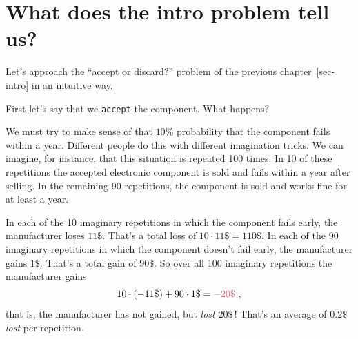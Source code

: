 \documentclass[
  a4paper,
  DIV=11,
  numbers=noendperiod,
  oneside]{scrreprt}
\begin{document}
\providecommand{\ul}{\uline}
\renewcommand*{\|}[1][]{\nonscript\:#1\vert\nonscript\:\mathopen{}}
\providecommand*{\pr}[1]{\textsf{\small`#1'}}
\renewcommand*{\pr}[1]{\textsf{\small`#1'}}
\providecommand*{\prq}[1]{\textsf{\small #1}}
\renewcommand*{\prq}[1]{\textsf{\small #1}}
\providecommand{\se}[1]{\mathsfit{#1}}
\renewcommand{\se}[1]{\mathsfit{#1}}
\providecommand{\p}{\mathrm{p}}
\renewcommand{\p}{\mathrm{p}}
\renewcommand{\P}{\mathrm{P}}

\hypertarget{what-does-the-intro-problem-tell-us}{%
\section{What does the intro problem tell
us?}\label{what-does-the-intro-problem-tell-us}}

Let's approach the ``accept or discard?'' problem of the previous
chapter~\ref{sec-intro} in an intuitive way.


First let's say that we \texttt{accept} the component. What happens?

We must try to make sense of that \(10\%\) probability that the
component fails within a year. Different people do this with different
imagination tricks. We can imagine, for instance, that this situation is
repeated 100 times. In 10 of these repetitions the accepted electronic
component is sold and fails within a year after selling. In the
remaining 90 repetitions, the component is sold and works fine for at
least a year.

In each of the 10 imaginary repetitions in which the component fails
early, the manufacturer loses \(11\$\). That's a total loss of
\(10 \cdot 11\$ = 110\$\). In each of the 90 imaginary repetitions in
which the component doesn't fail early, the manufacturer gains \(1\$\).
That's a total gain of \(90\$\). So over all 100 imaginary repetitions
the manufacturer gains \[
10\cdot (-11\$) + 90\cdot 1\$ = {\color[RGB]{238,102,119} -20\$} \ ,
\] that is, the manufacturer has not gained, but \emph{lost} \(20\$\)\,!
That's an average of \(0.2\$\) \emph{lost} per repetition.
\end{document}
